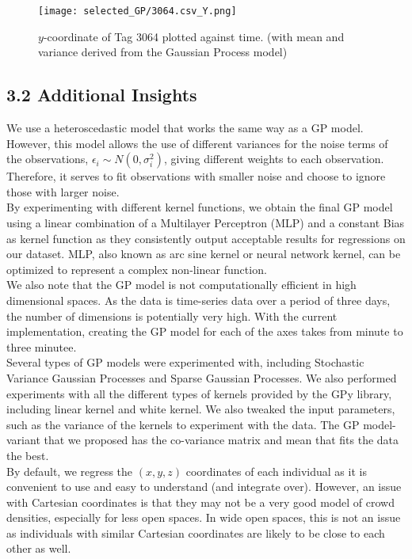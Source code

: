 \documentclass[letterpaper]{article}
\begin{document}
\begin{figure}[h!]
  \centering
    \texttt{[image: selected\_GP/3064.csv\_Y.png]}
  \caption{$y$-coordinate of Tag 3064 plotted against time. (with mean and variance derived from the Gaussian Process model)}
  \label{fig:GP2}
\end{figure}

\subsection{3.2  Additional Insights}

We use a heteroscedastic model that works the same way as a GP model. However, this model allows the use of different variances for the noise terms of the observations, $\epsilon_i \sim N(0, \sigma_i^2)$, giving different weights to each observation. Therefore, it serves to fit observations with smaller noise and choose to ignore those with larger noise. \\

By experimenting with different kernel functions, we obtain the final GP model using a linear combination of a Multilayer Perceptron (MLP) and a constant Bias as kernel function as they consistently output acceptable results for regressions on our dataset. MLP, also known as arc sine kernel or neural network kernel, can be optimized to represent a complex non-linear function. \\

We also note that the GP model is not computationally efficient in high dimensional spaces. As the data is time-series data over a period of three days, the number of dimensions is potentially very high. With the current implementation, creating the GP model for each of the axes takes from minute to three minutee. \\

Several types of GP models were experimented with, including Stochastic Variance Gaussian Processes and Sparse Gaussian Processes. We also performed experiments with all the different types of kernels provided by the GPy library, including linear kernel and white kernel. We also tweaked the input parameters, such as the variance of the kernels to experiment with the data. The GP model-variant that we proposed has the co-variance matrix and mean that fits the data the best. \\

By default, we regress the $(x,y,z)$ coordinates of each individual as it is convenient to use and easy to understand (and integrate over). However, an issue with Cartesian coordinates is that they may not be a very good model of crowd densities, especially for less open spaces. In wide open spaces, this is not an issue as individuals with similar Cartesian coordinates are likely to be close to each other as well.\\
\end{document}
